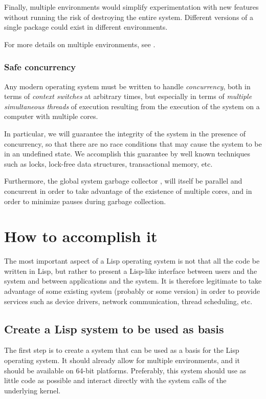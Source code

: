 Finally, multiple environments would simplify experimentation with
new features without running the risk of destroying the entire
system.  Different versions of a single package could exist in
different environments.

For more details on multiple environments, see
.

\subsubsection{Safe concurrency}

Any modern operating system must be written to handle
\emph{concurrency}, both in terms of \emph{context switches} at
arbitrary times, but especially in terms of \emph{multiple
  simultaneous threads} of execution resulting from the execution of
the system on a computer with multiple cores.

In particular, we will guarantee the integrity of the system in the
presence of concurrency, so that there are no race conditions that may
cause the system to be in an undefined state.  We accomplish this
guarantee by well known techniques such as locks, lock-free data
structures, transactional memory, etc.

Furthermore, the global system garbage collector
, will itself be parallel and
concurrent in order to take advantage of the existence of multiple
cores, and in order to minimize pauses during garbage collection.

\section{How to accomplish it}

The most important aspect of a Lisp operating system is not that all
the code be written in Lisp, but rather to present a Lisp-like
interface between users and the system and between applications and
the system.  It is therefore legitimate to take advantage of some
existing system (probably \linux{} or some \bsd{} version) in order to
provide services such as device drivers, network communication, thread
scheduling, etc.

\subsection{Create a Lisp system to be used as basis}

The first step is to create a \commonlisp{} system that can be used as a basis
for the Lisp operating system.  It should already allow for multiple
environments, and it should be available on 64-bit platforms.
Preferably, this system should use as little \clanguage{} code as
possible and interact directly with the system calls of the underlying
kernel.

